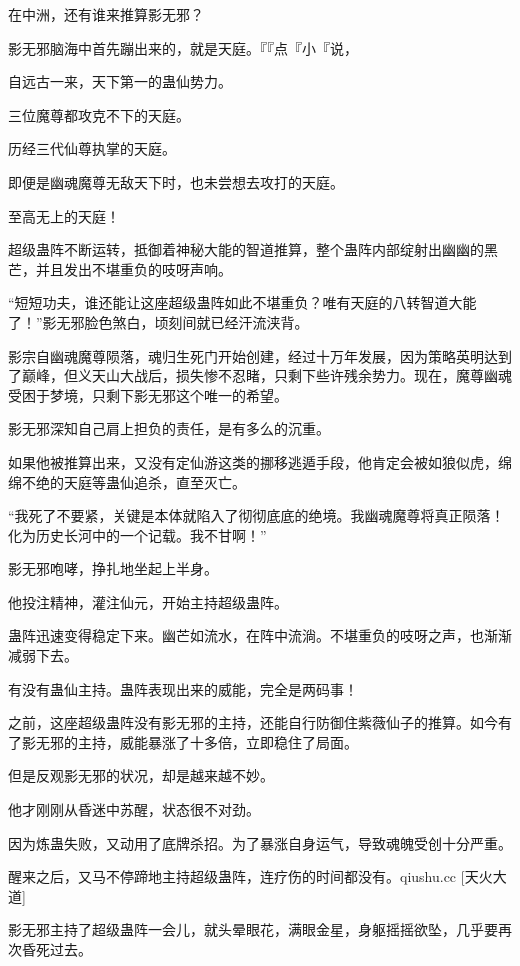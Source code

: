 
\begin{this_body}

在中洲，还有谁来推算影无邪？

影无邪脑海中首先蹦出来的，就是天庭。『『点『小『说，

自远古一来，天下第一的蛊仙势力。

三位魔尊都攻克不下的天庭。

历经三代仙尊执掌的天庭。

即便是幽魂魔尊无敌天下时，也未尝想去攻打的天庭。

至高无上的天庭！

超级蛊阵不断运转，抵御着神秘大能的智道推算，整个蛊阵内部绽射出幽幽的黑芒，并且发出不堪重负的吱呀声响。

“短短功夫，谁还能让这座超级蛊阵如此不堪重负？唯有天庭的八转智道大能了！”影无邪脸色煞白，顷刻间就已经汗流浃背。

影宗自幽魂魔尊陨落，魂归生死门开始创建，经过十万年发展，因为策略英明达到了巅峰，但义天山大战后，损失惨不忍睹，只剩下些许残余势力。现在，魔尊幽魂受困于梦境，只剩下影无邪这个唯一的希望。

影无邪深知自己肩上担负的责任，是有多么的沉重。

如果他被推算出来，又没有定仙游这类的挪移逃遁手段，他肯定会被如狼似虎，绵绵不绝的天庭等蛊仙追杀，直至灭亡。

“我死了不要紧，关键是本体就陷入了彻彻底底的绝境。我幽魂魔尊将真正陨落！化为历史长河中的一个记载。我不甘啊！”

影无邪咆哮，挣扎地坐起上半身。

他投注精神，灌注仙元，开始主持超级蛊阵。

蛊阵迅速变得稳定下来。幽芒如流水，在阵中流淌。不堪重负的吱呀之声，也渐渐减弱下去。

有没有蛊仙主持。蛊阵表现出来的威能，完全是两码事！

之前，这座超级蛊阵没有影无邪的主持，还能自行防御住紫薇仙子的推算。如今有了影无邪的主持，威能暴涨了十多倍，立即稳住了局面。

但是反观影无邪的状况，却是越来越不妙。

他才刚刚从昏迷中苏醒，状态很不对劲。

因为炼蛊失败，又动用了底牌杀招。为了暴涨自身运气，导致魂魄受创十分严重。

醒来之后，又马不停蹄地主持超级蛊阵，连疗伤的时间都没有。qiushu.cc [天火大道]

影无邪主持了超级蛊阵一会儿，就头晕眼花，满眼金星，身躯摇摇欲坠，几乎要再次昏死过去。


\end{this_body}
